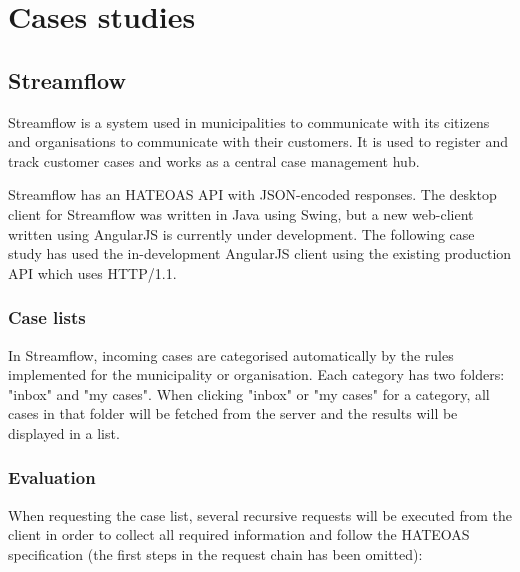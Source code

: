 \documentclass{cslthse-msc}
\begin{document}
\chapter{Cases studies}
\section{Streamflow}
Streamflow\cite{streamflow} is a system used in municipalities to communicate with its citizens and organisations to communicate with their customers. It is used to register and track customer cases and works as a central case management hub.

Streamflow has an HATEOAS API with JSON-encoded responses. The desktop client for Streamflow was written in Java using Swing, but a new web-client written using AngularJS is currently under development. The following case study has used the in-development AngularJS client using the existing production API which uses HTTP/1.1.

\subsection{Case lists}
In Streamflow, incoming cases are categorised automatically by the rules implemented for the municipality or organisation. Each category has two folders: "inbox" and "my cases". When clicking "inbox" or "my cases" for a category, all cases in that folder will be fetched from the server and the results will be displayed in a list.

\subsection{Evaluation}
When requesting the case list, several recursive requests will be executed from the client in order to collect all required information and follow the HATEOAS specification (the first steps in the request chain has been omitted):
\end{document}
